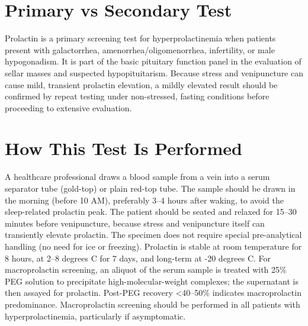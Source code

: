 \section*{Primary vs Secondary Test}
Prolactin is a primary screening test for hyperprolactinemia when patients present with galactorrhea, amenorrhea/oligomenorrhea, infertility, or male hypogonadism. It is part of the basic pituitary function panel in the evaluation of sellar masses and suspected hypopituitarism. Because stress and venipuncture can cause mild, transient prolactin elevation, a mildly elevated result should be confirmed by repeat testing under non-stressed, fasting conditions before proceeding to extensive evaluation.

\section*{How This Test Is Performed}
A healthcare professional draws a blood sample from a vein into a serum separator tube (gold-top) or plain red-top tube. The sample should be drawn in the morning (before 10 AM), preferably 3--4 hours after waking, to avoid the sleep-related prolactin peak. The patient should be seated and relaxed for 15--30 minutes before venipuncture, because stress and venipuncture itself can transiently elevate prolactin. The specimen does not require special pre-analytical handling (no need for ice or freezing). Prolactin is stable at room temperature for 8 hours, at 2--8 degrees C for 7 days, and long-term at -20 degrees C. For macroprolactin screening, an aliquot of the serum sample is treated with 25\% PEG solution to precipitate high-molecular-weight complexes; the supernatant is then assayed for prolactin. Post-PEG recovery <40--50\% indicates macroprolactin predominance. Macroprolactin screening should be performed in all patients with hyperprolactinemia, particularly if asymptomatic.

